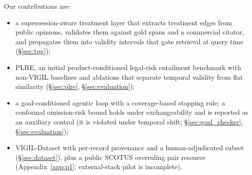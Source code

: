 Our contributions are:
\begin{itemize}[leftmargin=1.2em,itemsep=1pt,topsep=2pt]
  \item a supersession-aware treatment layer that extracts treatment edges from public opinions, validates them against gold spans and a commercial citator, and propagates them into validity intervals that gate retrieval at query time (\S\ref{sec:tpg});
  \item PLRE, an initial product-conditioned legal-risk entailment benchmark with non-VIGIL baselines and ablations that separate temporal validity from flat similarity (\S\ref{sec:plre}, \S\ref{sec:evaluation});
  \item a goal-conditioned agentic loop with a coverage-based stopping rule; a conformal omission-risk bound holds under exchangeability and is reported as an auxiliary control (it is violated under temporal shift; \S\ref{sec:goal_checker}, \S\ref{sec:evaluation});
  \item VIGIL-Dataset with per-record provenance and a human-adjudicated subset (\S\ref{sec:dataset}), plus a public SCOTUS overruling pair resource (Appendix~\ref{app:p1}; external-stack pilot is incomplete).
\end{itemize}

